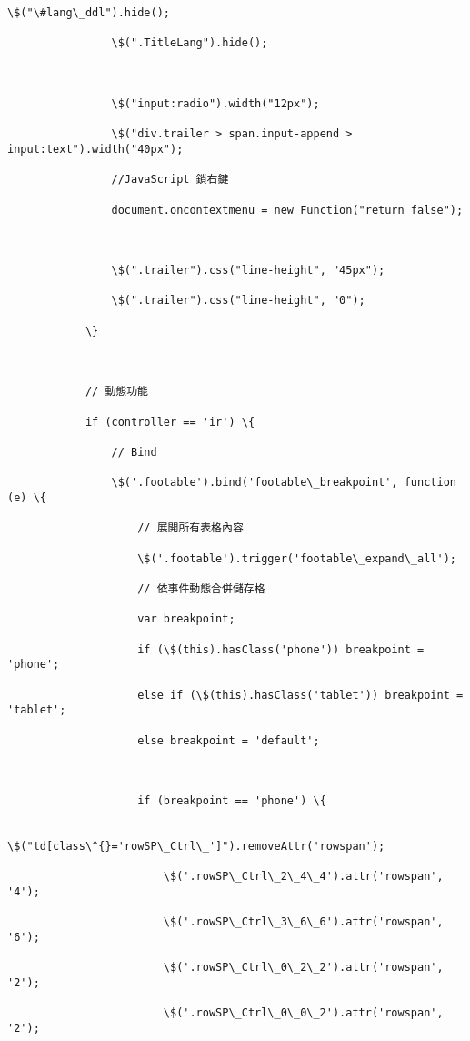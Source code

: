 \documentclass[11pt]{article}
\begin{document}
\begin{Verbatim}[commandchars=\\\{\}]
                \$("\#lang\_ddl").hide();

                \$(".TitleLang").hide();



                \$("input:radio").width("12px");

                \$("div.trailer > span.input-append > input:text").width("40px");

                //JavaScript 鎖右鍵

                document.oncontextmenu = new Function("return false");



                \$(".trailer").css("line-height", "45px");

                \$(".trailer").css("line-height", "0");

            \}



            // 動態功能

            if (controller == 'ir') \{

                // Bind

                \$('.footable').bind('footable\_breakpoint', function (e) \{

                    // 展開所有表格內容

                    \$('.footable').trigger('footable\_expand\_all');

                    // 依事件動態合併儲存格

                    var breakpoint;

                    if (\$(this).hasClass('phone')) breakpoint = 'phone';

                    else if (\$(this).hasClass('tablet')) breakpoint = 'tablet';

                    else breakpoint = 'default';



                    if (breakpoint == 'phone') \{

                        \$("td[class\^{}='rowSP\_Ctrl\_']").removeAttr('rowspan');

                        \$('.rowSP\_Ctrl\_2\_4\_4').attr('rowspan', '4');

                        \$('.rowSP\_Ctrl\_3\_6\_6').attr('rowspan', '6');

                        \$('.rowSP\_Ctrl\_0\_2\_2').attr('rowspan', '2');

                        \$('.rowSP\_Ctrl\_0\_0\_2').attr('rowspan', '2');


\end{Verbatim}
\end{document}
